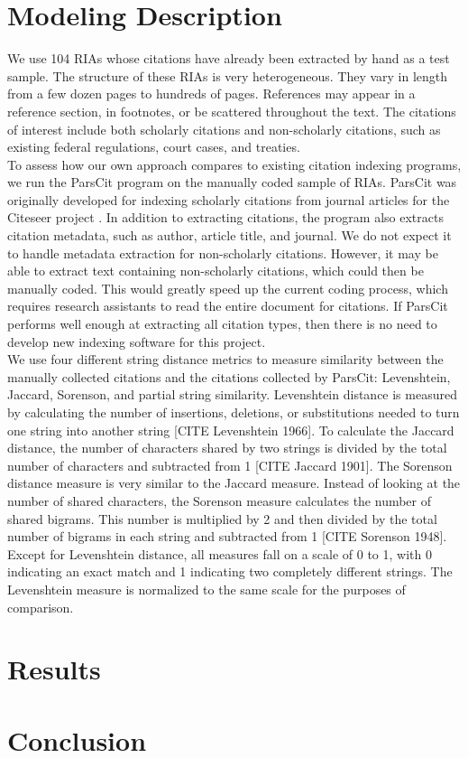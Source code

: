\documentclass[12pt]{article}
\begin{document}
\section{Modeling Description}
We use 104 RIAs whose citations have already been extracted by hand as a test sample. The structure of these RIAs is very heterogeneous. They vary in length from a few dozen pages to hundreds of pages. References may appear in a reference section, in footnotes, or be scattered throughout the text. The citations of interest include both scholarly citations and non-scholarly citations, such as existing federal regulations, court cases, and treaties. \\ 

To assess how our own approach compares to existing citation indexing programs, we run the ParsCit program on the manually coded sample of RIAs. ParsCit was originally developed for indexing scholarly citations from journal articles for the Citeseer project \cite{councilletal2008}. In addition to extracting citations, the program also extracts citation metadata, such as author, article title, and journal. We do not expect it to handle metadata extraction for non-scholarly citations. However, it may be able to extract text containing non-scholarly citations, which could then be manually coded. This would greatly speed up the current coding process, which requires research assistants to read the entire document for citations. If ParsCit performs well enough at extracting all citation types, then there is no need to develop new indexing software for this project.\\

We use four different string distance metrics to measure similarity between the manually collected citations and the citations collected by ParsCit: Levenshtein, Jaccard, Sorenson, and partial string similarity. Levenshtein distance is measured by calculating the number of insertions, deletions, or substitutions needed to turn one string into another string [CITE Levenshtein 1966]. To calculate the Jaccard distance, the number of characters shared by two strings is divided by the total number of characters and subtracted from 1 [CITE Jaccard 1901]. The Sorenson distance measure is very similar to the Jaccard measure. Instead of looking at the number of shared characters, the Sorenson measure calculates the number of shared bigrams. This number is multiplied by 2 and then divided by the total number of bigrams in each string and subtracted from 1 [CITE Sorenson 1948]. Except for Levenshtein distance, all measures fall on a scale of 0 to 1, with 0 indicating an exact match and 1 indicating two completely different strings. The Levenshtein measure is normalized to the same scale for the purposes of comparison.


\section{Results}

\section{Conclusion}

\clearpage
\singlespace

\nocite{*}

\clearpage
\end{document}
